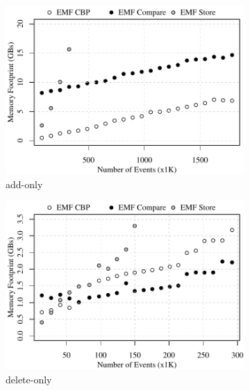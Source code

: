 \begin{figure}[ht]
  \centering
  \begin{subfigure}[t]{0.490\linewidth}
    \includegraphics[width=\linewidth]{add-conflict-memory-events}
    \caption{add-only}
    \label{fig:add-conflict-memory-events}
  \end{subfigure}
  \hfill
  \begin{subfigure}[t]{0.490\linewidth}
    \includegraphics[width=\linewidth]{delete-conflict-memory-events}
    \caption{delete-only}
    \label{fig:delete-conflict-memory-events}
  \end{subfigure}
  \\
  \begin{subfigure}[t]{0.490\linewidth}

\end{subfigure}
\end{figure}
